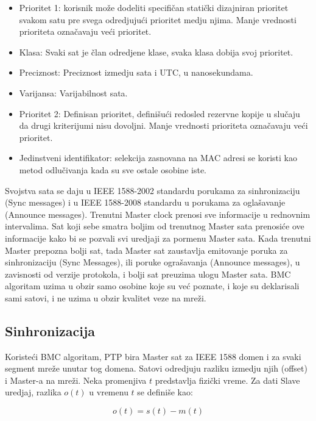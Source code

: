 \documentclass[a4paper,12pt, master]{etf}
\begin{document}
	\begin{itemize}
		\item Prioritet 1: korisnik mo\v{z}e dodeliti specifi\v{c}an 
		stati\v{c}ki dizajniran prioritet svakom satu pre svega odredjuju\'{c}i 
		prioritet medju njima. Manje vrednosti prioriteta ozna\v{c}avaju 
		ve\'{c}i prioritet.
		\item Klasa: Svaki sat je \v{c}lan odredjene klase, svaka klasa dobija 
		svoj prioritet.
		\item Preciznost: Preciznost izmedju sata i UTC, u nanosekundama.
		\item Varijansa: Varijabilnost sata.
		\item Prioritet 2: Definisan prioritet, defini\v{s}u\'{c}i redosled 
		rezervne kopije u slu\v{c}aju da drugi kriterijumi nisu dovoljni. Manje 
		vrednosti prioriteta ozna\v{c}avaju ve\'{c}i prioritet.
		\item Jedinstveni identifikator: selekcija zasnovana na MAC adresi se 
		koristi kao metod odlu\v{c}ivanja kada su sve ostale osobine iste.
	\end{itemize}

	Svojstva sata se daju u IEEE 1588-2002 standardu porukama za sinhronizaciju 
	(Sync messages) i u	IEEE 1588-2008 standardu u porukama za ogla\v{s}avanje 
	(Announce messages). Trenutni Master clock prenosi sve informacije u 
	rednovnim intervalima. Sat koji sebe smatra boljim od trenutnog Master
	sata prenosi\'{c}e ove informacije kako bi se pozvali svi uredjaji za
	pormenu Master sata. Kada trenutni Master prepozna bolji sat, tada Master 
	sat	zaustavlja emitovanje poruka za sinhronizaciju (Sync Messages), ili 
	poruke ogra\v{s}avanja (Announce messages), u zavisnosti od verzije 
	protokola, i bolji sat preuzima ulogu Master sata. BMC algoritam uzima u 
	obzir samo osobine koje su ve\'{c} poznate, i koje su deklarisali sami 
	satovi, i ne uzima u obzir kvalitet veze na mre\v{z}i.

	\subsection{Sinhronizacija}

	Koriste\'{c}i BMC algoritam, PTP bira Master sat za IEEE 1588 domen i za 
	svaki segment mre\v{z}e unutar tog domena. Satovi odredjuju razliku izmedju 
	njih (offset) i Master-a na mre\v{z}i. Neka promenjiva $t$ predstavlja 
	fizi\v{c}ki vreme. Za dati Slave uredjaj, razlika $o(t)$ u vremenu $t$ se 
	defini\v{s}e kao:

	\begin{equation}
		o(t) = s(t) - m(t)
	\end{equation}
\end{document}
